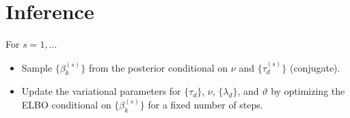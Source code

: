 \documentclass[11pt, oneside]{article}   	%
\begin{document}
\section{Inference}

For $s=1,\dotsc$
\begin{itemize}
	\item Sample $\{\beta_k^{(s)} \}$ from the posterior conditional on $\nu$ and $\{\tau_d^{(s)}\}$ (conjugate).
	\item Update the variational parameters for $\{\tau_d\}$, $\nu$, $\{\lambda_d\}$, and $\vartheta$ by optimizing the ELBO conditional on $\{\beta_k^{(s)} \}$ for a fixed number of steps.
\end{itemize}
\end{document}
